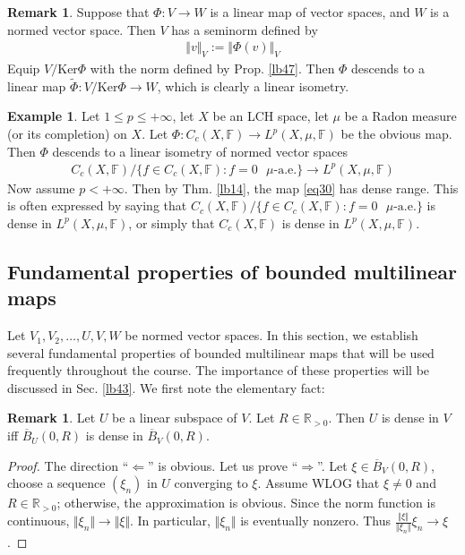 \documentclass[12pt,b5paper,notitlepage]{article}
\theoremstyle{definition}
\newtheorem{eg}[df]{Example}
\newtheorem{rem}[df]{Remark}
\theoremstyle{plain}
\newcommand{\wtd}{\widetilde}
\newcommand{\ovl}{\overline}
\newcommand{\Rbb}{\mathbb R}
\newcommand{\Ker}{\mathrm{Ker}}
\newcommand{\Fbb}{\mathbb F}
\numberwithin{equation}{section}
\begin{document}
\begin{rem}
Suppose that $\Phi:V\rightarrow W$ is a linear map of vector spaces, and $W$ is a normed vector space. Then $V$ has a seminorm defined by
\begin{align*}
\Vert v\Vert_V:=\Vert \Phi(v)\Vert_V
\end{align*}
Equip $V/\Ker\Phi$ with the norm defined by Prop. \ref{lb47}. Then $\Phi$ descends to a linear map $\wtd\Phi:V/\Ker\Phi\rightarrow W$, which is clearly a linear isometry. 
\end{rem}

\begin{eg}\label{lb48}
Let $1\leq p\leq+\infty$, let $X$ be an LCH space, let $\mu$ be a Radon measure (or its completion) on $X$. Let $\Phi:C_c(X,\Fbb)\rightarrow L^p(X,\mu,\Fbb)$ be the obvious map. Then $\Phi$ descends to a linear isometry of normed vector spaces
\begin{gather}\label{eq30}
C_c(X,\Fbb)\big/\big\{f\in C_c(X,\Fbb):f=0\text{ $\mu$-a.e.}\big\}\longrightarrow L^p(X,\mu,\Fbb)
\end{gather}
Now assume $p<+\infty$. Then by Thm. \ref{lb14}, the map \eqref{eq30} has dense range. This is often expressed by saying that $C_c(X,\Fbb)\big/\big\{f\in C_c(X,\Fbb):f=0\text{ $\mu$-a.e.}\big\}$ is dense in $L^p(X,\mu,\Fbb)$, or simply that $C_c(X,\Fbb)$ is dense in $L^p(X,\mu,\Fbb)$.
\end{eg}





\subsection{Fundamental properties of bounded multilinear maps}

Let $V_1,V_2,\dots,U,V,W$ be normed vector spaces. In this section, we establish several fundamental properties of bounded multilinear maps that will be used frequently throughout the course. The importance of these properties will be discussed in Sec. \ref{lb43}. We first note the elementary fact:

\begin{rem}\label{lb29}
Let $U$ be a linear subspace of $V$. Let $R\in\Rbb_{>0}$. Then $U$ is dense in $V$ iff $\ovl B_U(0,R)$ is dense in $\ovl B_V(0,R)$. 
\end{rem}

\begin{proof}
The direction ``$\Leftarrow$'' is obvious. Let us prove ``$\Rightarrow$''. Let $\xi\in\ovl B_V(0,R)$, choose a sequence $(\xi_n)$ in $U$ converging to $\xi$. Assume WLOG that $\xi\neq0$ and $R\in\Rbb_{>0}$; otherwise, the approximation is obvious. Since the norm function is continuous, $\Vert\xi_n\Vert\rightarrow\Vert\xi\Vert$. In particular, $\Vert\xi_n\Vert$ is eventually nonzero. Thus $\frac{\Vert\xi\Vert}{\Vert\xi_n\Vert}\xi_n\rightarrow \xi$.
\end{proof}
\end{document}
